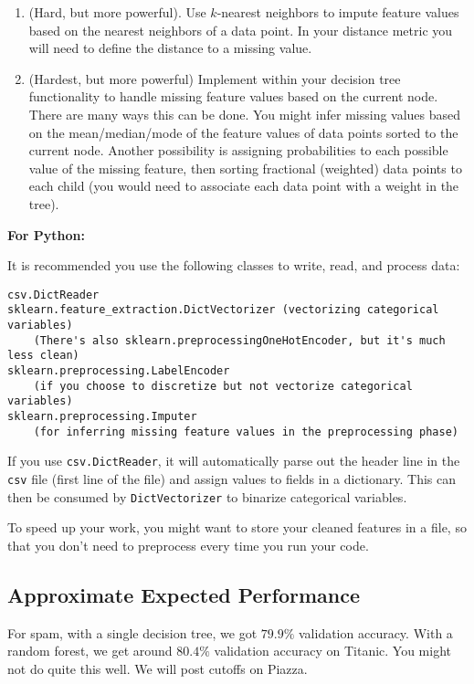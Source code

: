 \begin{enumerate}
\begin{enumerate}
    \item (Hard, but more powerful). Use $k$-nearest neighbors to impute feature values based on the nearest neighbors of a data point. In your distance metric you will need to define the distance to a missing value. 

    \item (Hardest, but more powerful) Implement within your decision tree functionality to handle missing feature values based on the current node. There are many ways this can be done. You might infer missing values based on the mean/median/mode of the feature values of data points sorted to the current node. Another possibility is assigning probabilities to each possible value of the missing feature, then sorting fractional (weighted) data points to each child (you would need to associate each data point with a weight in the tree).
    \end{enumerate}
\end{enumerate}

\textbf{For Python:}

It is recommended you use the following classes to write, read, and process data:

\begin{verbatim}
csv.DictReader
sklearn.feature_extraction.DictVectorizer (vectorizing categorical variables)
    (There's also sklearn.preprocessingOneHotEncoder, but it's much less clean)
sklearn.preprocessing.LabelEncoder
    (if you choose to discretize but not vectorize categorical variables)
sklearn.preprocessing.Imputer
    (for inferring missing feature values in the preprocessing phase)
\end{verbatim}

If you use \verb+csv.DictReader+, it will automatically parse out the header line in the \verb+csv+ file (first line of the file) and assign values to fields in a dictionary. This can then be consumed by \verb+DictVectorizer+ to binarize categorical variables.

To speed up your work, you might want to store your cleaned features in a file, so that you don't need to preprocess every time you run your code.


\subsection*{Approximate Expected Performance}
For spam, with a single decision tree, we got $79.9\%$ validation accuracy.
With a random forest, we get around $80.4\%$ validation accuracy on Titanic. You might not do quite this well. We will post cutoffs on Piazza.


